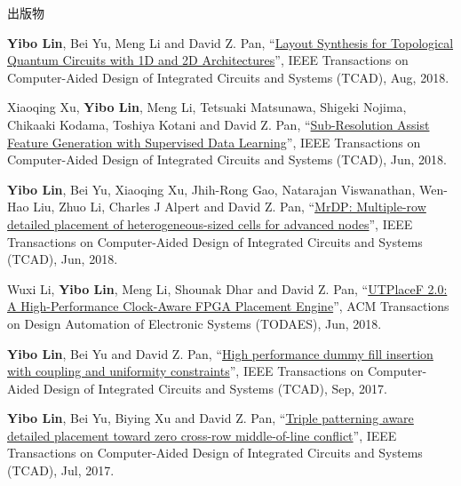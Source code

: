 \begin{rSection}{出版物}
\begin{description}[font=\normalfont]
{}
            

\item[{[J11]}]{
        \textbf{Yibo Lin}, Bei Yu, Meng Li and David Z. Pan, 
    ``\href{https://doi.org/10.1109/TCAD.2017.2760511}{Layout Synthesis for Topological Quantum Circuits with 1D and 2D Architectures}'', 
    IEEE Transactions on Computer-Aided Design of Integrated Circuits and Systems (TCAD), Aug, 2018.
    
}
            

\item[{[J10]}]{
        Xiaoqing Xu, \textbf{Yibo Lin}, Meng Li, Tetsuaki Matsunawa, Shigeki Nojima, Chikaaki Kodama, Toshiya Kotani and David Z. Pan, 
    ``\href{https://doi.org/10.1109/TCAD.2017.2748029}{Sub-Resolution Assist Feature Generation with Supervised Data Learning}'', 
    IEEE Transactions on Computer-Aided Design of Integrated Circuits and Systems (TCAD), Jun, 2018.
    
}
            

\item[{[J9]}]{
        \textbf{Yibo Lin}, Bei Yu, Xiaoqing Xu, Jhih-Rong Gao, Natarajan Viswanathan, Wen-Hao Liu, Zhuo Li, Charles J Alpert and David Z. Pan, 
    ``\href{https://doi.org/10.1109/TCAD.2017.2748025}{MrDP: Multiple-row detailed placement of heterogeneous-sized cells for advanced nodes}'', 
    IEEE Transactions on Computer-Aided Design of Integrated Circuits and Systems (TCAD), Jun, 2018.
    
}
            

\item[{[J8]}]{
        Wuxi Li, \textbf{Yibo Lin}, Meng Li, Shounak Dhar and David Z. Pan, 
    ``\href{https://doi.org/10.1145/3174849}{UTPlaceF 2.0: A High-Performance Clock-Aware FPGA Placement Engine}'', 
    ACM Transactions on Design Automation of Electronic Systems (TODAES), Jun, 2018.
    
}
            

\item[{[J7]}]{
        \textbf{Yibo Lin}, Bei Yu and David Z. Pan, 
    ``\href{http://dx.doi.org/10.1109/TCAD.2016.2638452}{High performance dummy fill insertion with coupling and uniformity constraints}'', 
    IEEE Transactions on Computer-Aided Design of Integrated Circuits and Systems (TCAD), Sep, 2017.
    
}
            

\item[{[J6]}]{
        \textbf{Yibo Lin}, Bei Yu, Biying Xu and David Z. Pan, 
    ``\href{http://dx.doi.org/10.1109/TCAD.2017.2648843}{Triple patterning aware detailed placement toward zero cross-row middle-of-line conflict}'', 
    IEEE Transactions on Computer-Aided Design of Integrated Circuits and Systems (TCAD), Jul, 2017.
    
}
\end{description}
\end{rSection}
